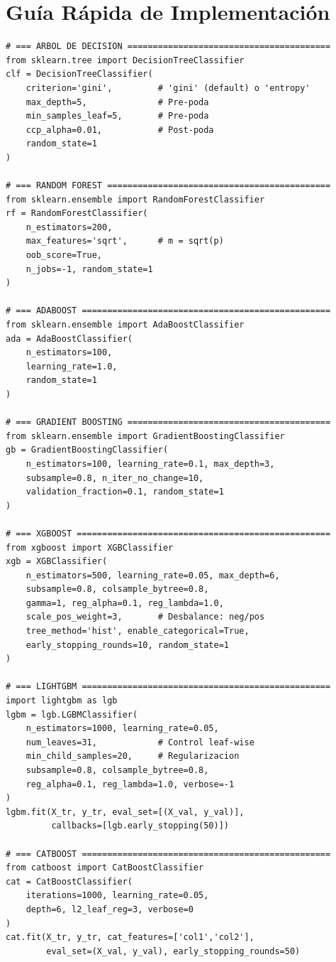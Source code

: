 \documentclass[11pt, a4paper]{book}
\begin{document}
\section{Guía Rápida de Implementación}

\begin{lstlisting}[caption={Cheatsheet de código — todos los modelos}]
# === ARBOL DE DECISION ========================================
from sklearn.tree import DecisionTreeClassifier
clf = DecisionTreeClassifier(
    criterion='gini',         # 'gini' (default) o 'entropy'
    max_depth=5,              # Pre-poda
    min_samples_leaf=5,       # Pre-poda
    ccp_alpha=0.01,           # Post-poda
    random_state=1
)

# === RANDOM FOREST ============================================
from sklearn.ensemble import RandomForestClassifier
rf = RandomForestClassifier(
    n_estimators=200,
    max_features='sqrt',      # m = sqrt(p)
    oob_score=True,
    n_jobs=-1, random_state=1
)

# === ADABOOST =================================================
from sklearn.ensemble import AdaBoostClassifier
ada = AdaBoostClassifier(
    n_estimators=100,
    learning_rate=1.0,
    random_state=1
)

# === GRADIENT BOOSTING ========================================
from sklearn.ensemble import GradientBoostingClassifier
gb = GradientBoostingClassifier(
    n_estimators=100, learning_rate=0.1, max_depth=3,
    subsample=0.8, n_iter_no_change=10,
    validation_fraction=0.1, random_state=1
)

# === XGBOOST ==================================================
from xgboost import XGBClassifier
xgb = XGBClassifier(
    n_estimators=500, learning_rate=0.05, max_depth=6,
    subsample=0.8, colsample_bytree=0.8,
    gamma=1, reg_alpha=0.1, reg_lambda=1.0,
    scale_pos_weight=3,       # Desbalance: neg/pos
    tree_method='hist', enable_categorical=True,
    early_stopping_rounds=10, random_state=1
)

# === LIGHTGBM =================================================
import lightgbm as lgb
lgbm = lgb.LGBMClassifier(
    n_estimators=1000, learning_rate=0.05,
    num_leaves=31,            # Control leaf-wise
    min_child_samples=20,     # Regularizacion
    subsample=0.8, colsample_bytree=0.8,
    reg_alpha=0.1, reg_lambda=1.0, verbose=-1
)
lgbm.fit(X_tr, y_tr, eval_set=[(X_val, y_val)],
         callbacks=[lgb.early_stopping(50)])

# === CATBOOST =================================================
from catboost import CatBoostClassifier
cat = CatBoostClassifier(
    iterations=1000, learning_rate=0.05,
    depth=6, l2_leaf_reg=3, verbose=0
)
cat.fit(X_tr, y_tr, cat_features=['col1','col2'],
        eval_set=(X_val, y_val), early_stopping_rounds=50)


\end{lstlisting}
\end{document}
